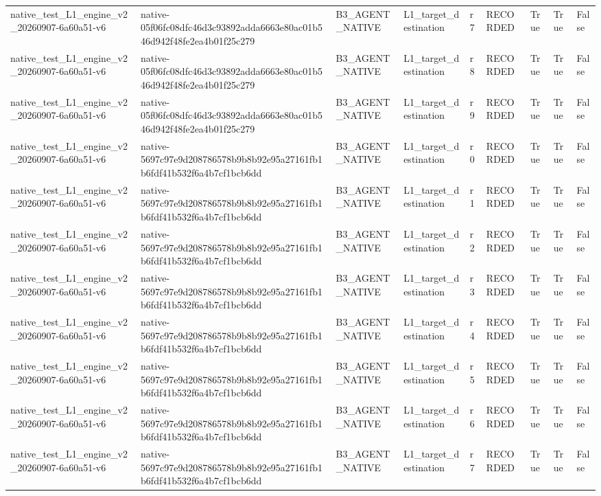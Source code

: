 \begin{tabular}{lllllllll}
native\_test\_L1\_engine\_v2\_20260907-6a60a51-v6 & native-05f06fc08dfc46d3c93892adda6663e80ac01b546d942f48fe2ea4b01f25c279 & B3\_AGENT\_NATIVE & L1\_target\_destination & r7 & RECORDED & True & True & False \\
native\_test\_L1\_engine\_v2\_20260907-6a60a51-v6 & native-05f06fc08dfc46d3c93892adda6663e80ac01b546d942f48fe2ea4b01f25c279 & B3\_AGENT\_NATIVE & L1\_target\_destination & r8 & RECORDED & True & True & False \\
native\_test\_L1\_engine\_v2\_20260907-6a60a51-v6 & native-05f06fc08dfc46d3c93892adda6663e80ac01b546d942f48fe2ea4b01f25c279 & B3\_AGENT\_NATIVE & L1\_target\_destination & r9 & RECORDED & True & True & False \\
native\_test\_L1\_engine\_v2\_20260907-6a60a51-v6 & native-5697c97e9d208786578b9b8b92e95a27161fb1b6fdf41b532f6a4b7cf1bcb6dd & B3\_AGENT\_NATIVE & L1\_target\_destination & r0 & RECORDED & True & True & False \\
native\_test\_L1\_engine\_v2\_20260907-6a60a51-v6 & native-5697c97e9d208786578b9b8b92e95a27161fb1b6fdf41b532f6a4b7cf1bcb6dd & B3\_AGENT\_NATIVE & L1\_target\_destination & r1 & RECORDED & True & True & False \\
native\_test\_L1\_engine\_v2\_20260907-6a60a51-v6 & native-5697c97e9d208786578b9b8b92e95a27161fb1b6fdf41b532f6a4b7cf1bcb6dd & B3\_AGENT\_NATIVE & L1\_target\_destination & r2 & RECORDED & True & True & False \\
native\_test\_L1\_engine\_v2\_20260907-6a60a51-v6 & native-5697c97e9d208786578b9b8b92e95a27161fb1b6fdf41b532f6a4b7cf1bcb6dd & B3\_AGENT\_NATIVE & L1\_target\_destination & r3 & RECORDED & True & True & False \\
native\_test\_L1\_engine\_v2\_20260907-6a60a51-v6 & native-5697c97e9d208786578b9b8b92e95a27161fb1b6fdf41b532f6a4b7cf1bcb6dd & B3\_AGENT\_NATIVE & L1\_target\_destination & r4 & RECORDED & True & True & False \\
native\_test\_L1\_engine\_v2\_20260907-6a60a51-v6 & native-5697c97e9d208786578b9b8b92e95a27161fb1b6fdf41b532f6a4b7cf1bcb6dd & B3\_AGENT\_NATIVE & L1\_target\_destination & r5 & RECORDED & True & True & False \\
native\_test\_L1\_engine\_v2\_20260907-6a60a51-v6 & native-5697c97e9d208786578b9b8b92e95a27161fb1b6fdf41b532f6a4b7cf1bcb6dd & B3\_AGENT\_NATIVE & L1\_target\_destination & r6 & RECORDED & True & True & False \\
native\_test\_L1\_engine\_v2\_20260907-6a60a51-v6 & native-5697c97e9d208786578b9b8b92e95a27161fb1b6fdf41b532f6a4b7cf1bcb6dd & B3\_AGENT\_NATIVE & L1\_target\_destination & r7 & RECORDED & True & True & False \\

\end{tabular}
